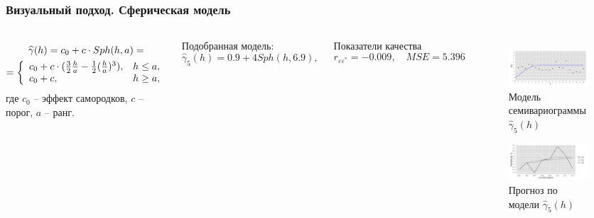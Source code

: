 \documentclass[10pt,pdf,aspectratio=169,hyperref={unicode}]{beamer}
\begin{document}
\begin{frame}
  \frametitle{Визуальный подход. \small{Сферическая модель}}
  \begin{columns}[c]
  \column{3in}
  \begin{equation}\begin{gathered}
  \label{eq:sph}
    \widehat{\gamma}(h) = c_0 + c \cdot Sph(h, a) = \\
    = \left\{
    \begin{array}{l l}
      c_0 + c \cdot (\frac{3}{2} \frac{h}{a} - \frac{1}{2}(\frac{h}{a})^3), & h \le a, \\
      c_0 + c, & h \geq a,
    \end{array} \right.
  \end{gathered}\end{equation}
  где $ c_0 $ -- эффект самородков, $ c $ -- порог, $ a $ -- ранг.

  \vspace{0.5em}

  Подобранная модель:
  \begin{equation}
  \label{eq:gamma5}
    \widehat{\gamma}_5(h) = 0.9 + 4 Sph(h, 6.9),
  \end{equation}

  Показатели качества
  \begin{equation*}
    r_{\varepsilon\varepsilon^{*}} = -0.009, \quad MSE = 5.396
  \end{equation*}

  \column{3in}
  \vspace{-14.5pt}
  \begin{figure}[H]
    \includegraphics[width=0.9\linewidth]{../../figures/variogram/sph-fit-adapt-modeled.png} \\
    \caption{Модель семивариограммы $\widehat{\gamma}_5(h)$}
    \includegraphics[width=0.9\linewidth]{../../figures/variogram/sph-fit-adapt-cross-prediction.png}
    \caption{Прогноз по модели $\widehat{\gamma}_5(h)$}
  \end{figure}
  \end{columns}
\end{frame}
\end{document}
